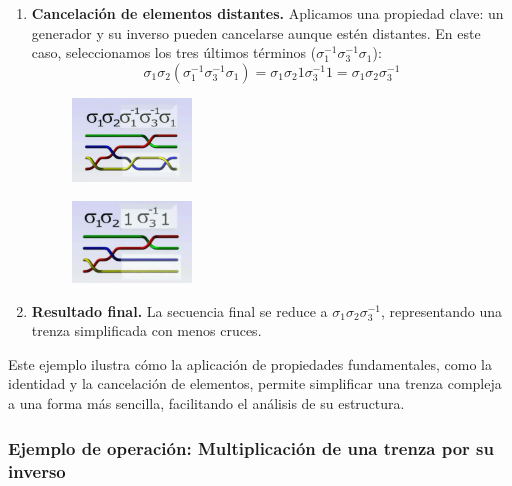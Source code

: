 \begin{enumerate}
    \item \textbf{Cancelación de elementos distantes.} Aplicamos una propiedad clave: un generador y su inverso pueden cancelarse aunque estén distantes. En este caso, seleccionamos los tres últimos términos (\(\sigma_1^{-1} \sigma_3^{-1} \sigma_1\)):
    \[
        \sigma_1 \sigma_2 (\sigma_1^{-1} \sigma_3^{-1} \sigma_1) = \sigma_1 \sigma_2 1 \sigma_3^{-1} 1 = \sigma_1 \sigma_2 \sigma_3^{-1}
    \]

    \begin{figure}[h!]
        \centering
        \includegraphics[width=0.3\textwidth]{figures/chapters/2_artin/ejemplo_op_11.png}
        \caption{\cite{esterdalvitBraidsChapter12013}}
    \end{figure}

    \begin{figure}[h!]
        \centering
        \includegraphics[width=0.3\textwidth]{figures/chapters/2_artin/ejemplo_op_12.png}
        \caption{\cite{esterdalvitBraidsChapter12013}}
    \end{figure}

    \item \textbf{Resultado final.} La secuencia final se reduce a \( \sigma_1 \sigma_2 \sigma_3^{-1}\), representando una trenza simplificada con menos cruces.
\end{enumerate}

Este ejemplo ilustra cómo la aplicación de propiedades fundamentales, como la identidad y la cancelación de elementos, permite simplificar una trenza compleja a una forma más sencilla, facilitando el análisis de su estructura.

\subsubsection*{Ejemplo de operación: Multiplicación de una trenza por su inverso}

